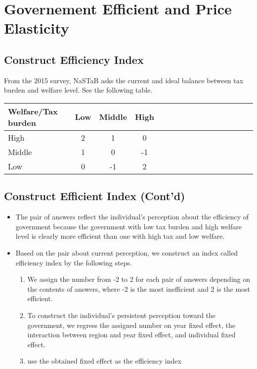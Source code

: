 \documentclass[ review  , 3p ]{elsarticle}
\providecommand{\tightlist}{%
  \setlength{\itemsep}{0pt}\setlength{\parskip}{0pt}}
\begin{document}
  \hypertarget{governement-efficient-and-price-elasticity}{%
  \section{Governement Efficient and Price Elasticity}\label{governement-efficient-and-price-elasticity}}
  
  \hypertarget{construct-efficiency-index}{%
  \subsection{Construct Efficiency Index}\label{construct-efficiency-index}}
  
  From the 2015 survey, NaSTaB asks the current and ideal balance between tax burden and welfare level.
  See the following table.
  
  \begin{table}[H]
  \centering\begingroup\fontsize{8}{10}\selectfont
  
  \begin{tabular}{l|cccl|cccl|cccl|ccc}
  \toprule
  Welfare/Tax burden & Low & Middle & High\\
  \midrule
  High & 2 & 1 & 0\\
  Middle & 1 & 0 & -1\\
  Low & 0 & -1 & 2\\
  \bottomrule
  \end{tabular}
  \endgroup{}
  \end{table}
  
  \hypertarget{construct-efficient-index-contd}{%
  \subsection{Construct Efficient Index (Cont'd)}\label{construct-efficient-index-contd}}
  
  \begin{itemize}
  \tightlist
  \item
    The pair of answers reflect the individual's perception about the efficiency of government because the government with low tax burden and high welfare level is clearly more efficient than one with high tax and low welfare.
  \item
    Based on the pair about current perception, we construct an index called efficiency index by the following steps.
  
    \begin{enumerate}
    \def\labelenumi{\arabic{enumi}.}
    \tightlist
    \item
      We assign the number from -2 to 2 for each pair of answers depending on the contents of answers, where -2 is the most inefficient and 2 is the most efficient.
    \item
      To construct the individual's persistent perception toward the government, we regress the assigned number on year fixed effect, the interaction between region and year fixed effect, and individual fixed effect.
    \item
      use the obtained fixed effect as the efficiency index
    \end{enumerate}
  \end{itemize}
  
\end{document}
